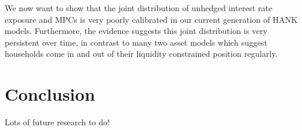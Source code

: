 \documentclass[titlepage]{\econtex}\newcommand{\texname}{ConsumptionHeterogeneity}
\begin{document}
We now want to show that the joint distribution of unhedged interest rate exposure and MPCs is very poorly calibrated in our current generation of HANK models. Furthermore, the evidence suggests this joint distribution is very persistent over time, in contrast to many two asset models which suggest households come in and out of their liquidity constrained position regularly.


\section{Conclusion}
Lots of future research to do!


\processdelayedfloats

\small

\normalsize
\end{document}
